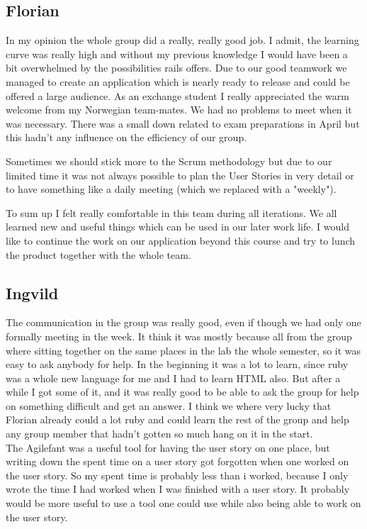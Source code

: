 \documentclass[a4paper]{article}
\begin{document}
\subsection{Florian}
In my opinion the whole group did a really, really good job. I admit, the learning curve was really high and without my previous knowledge I would have been a bit overwhelmed by the possibilities rails offers. Due to our good teamwork we managed to create an application which is nearly ready to release and could be offered a large audience. As an exchange student I really appreciated the warm welcome from my Norwegian team-mates. We had no problems to meet when it was necessary. There was a small down related to exam preparations in April but this hadn't any influence on the efficiency of our group.

\noindent
Sometimes we should stick more to the Scrum methodology but due to our limited time it was not always possible to plan the User Stories in very detail or to have something like a daily meeting (which we replaced with a "weekly").

\noindent
To sum up I felt really comfortable in this team during all iterations. We all learned new and useful things which can be used in our later work life. I would like to continue the work on our application beyond this course and try to lunch the product together with the whole team.

\subsection{Ingvild}
The communication in the group was really good, even if though we had only one formally meeting in the week. It think it was mostly because all from the group where sitting together on the same places in the lab the whole semester, so it was easy to ask anybody for help. In the beginning it was a lot to learn, since ruby was a whole new language for me and I had to learn HTML also. But after a while I got some of it, and it was really good to be able to ask the group for help on something difficult and get an answer. I think we where very lucky that Florian already could a lot ruby and could learn the rest of the group and help any group member that hadn't gotten so much hang on it in the start.\\

\noindent
The Agilefant was a useful tool for having the user story on one place, but writing down the spent time on a user story got forgotten when one worked on the user story. So my spent time is probably less than i worked, because I only wrote the time I had worked when I was finished with a user story. It probably would be more useful to use a tool one could use while also being able to work on the user story. \\
\end{document}
